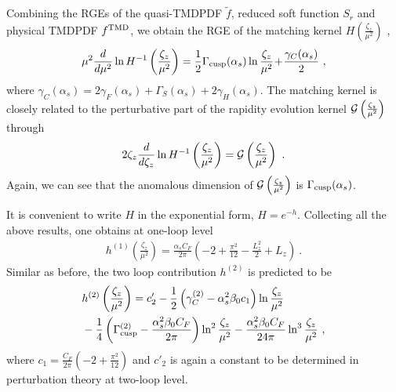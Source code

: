 \documentclass[aps,rmp,reprint,amsmath,amssymb,graphicx,longbibliography]{revtex4-1} %
\newcommand{\nn}{\nonumber}
\begin{document}
Combining the RGEs of the quasi-TMDPDF $\tilde f$, reduced soft function $S_r$ and physical TMDPDF $f^{\rm TMD}$, we obtain the RGE of the matching kernel $H\left(\frac{\zeta_z}{\mu^2}\right)$ \cite{Ji:2019ewn},
\begin{align}
	\mu^2 \frac{d}{d\mu^2} \ln H^{-1}\left(\frac{\zeta_z}{\mu^2}\right)=\frac{1}{2}\Gamma_{\rm cusp}(\alpha_s)  \ln\frac{\zeta_z}{\mu^2}\!+\!\frac{\gamma_C(\alpha_s)}{2}  \ ,
\end{align}
where $\gamma_C(\alpha_s)=2\gamma_F(\alpha_s)+\Gamma_S(\alpha_s)+2\gamma_H(\alpha_s)$. The matching kernel is closely related to the perturbative part of the rapidity evolution kernel ${\cal G}\left(\frac{\zeta_z}{\mu^2}\right)$ through
\begin{align}
	2\zeta_z\frac{d}{d\zeta_z}\ln H^{-1}\left(\frac{\zeta_z}{\mu^2}\right)={\cal G}\left(\frac{\zeta_z}{\mu^2}\right) \ .
\end{align}
Again, we can see that the anomalous dimension of ${\cal G}\left(\frac{\zeta_z}{\mu^2}\right)$ is $\Gamma_{\rm cusp}(\alpha_s)$.

It is convenient to write $H$ in the exponential form, $H=e^{-h}$. Collecting all the above results, one obtains at one-loop level~\cite{Ji:2018hvs,Ebert:2019okf}
\begin{align}
	h^{(1)}\left(\frac{\zeta_z}{\mu^2}
	\right)=\frac{\alpha_sC_F}{2\pi}\left(-2+\frac{\pi^2}{12}-\frac{L_z^2}{2}+L_z\right) \ .
\end{align}
Similar as before, the two loop contribution $h^{(2)}$ is predicted to be
\begin{align}
	&h^{(2)}\left(\frac{\zeta_z}{\mu^2}\right)=c'_2-\frac{1}{2}\left(\gamma^{(2)}_C-\alpha_s^2\beta_0 c_1\right)\ln\frac{\zeta_z}{\mu^2}\\
	&-\frac{1}{4}\left(\Gamma^{(2)}_{\rm cusp}-\frac{\alpha_s^2\beta_0 C_F}{2\pi}\right)\ln^2\frac{\zeta_z}{\mu^2}-\frac{\alpha_s^2\beta_0C_F}{24\pi}\ln^3\frac{\zeta_z}{\mu^2} \ ,\nn
\end{align}
where $c_1=\frac{C_F}{2\pi}\left(-2+\frac{\pi^2}{12}\right)$ and $c'_2$ is again a constant to be determined in perturbation theory at two-loop level.
\end{document}
